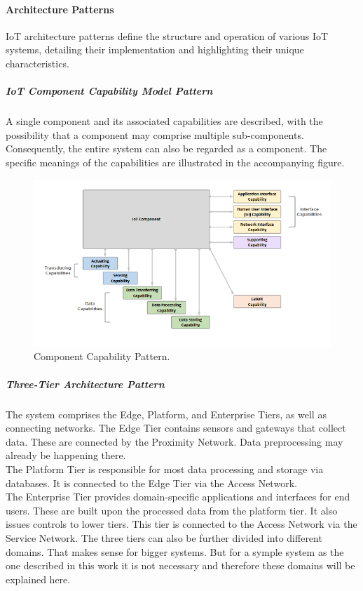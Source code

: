 \paragraph{Architecture Patterns}
IoT architecture patterns define the structure and operation of various IoT systems, detailing their implementation and highlighting their unique characteristics.
\subparagraph{IoT Component Capability Model Pattern}
A single component and its associated capabilities are described, with the possibility that a component may comprise multiple sub-components. Consequently, the entire system can also be regarded as a component. The specific meanings of the capabilities are illustrated in the accompanying figure.
\begin{figure}[H]
	\includegraphics[width=\linewidth]{pic/IIRA-model-component-pattern.png}
	\caption{Component Capability Pattern.}
	\label{fig:Model-Component-Pattern}
\end{figure}
\subparagraph{Three-Tier Architecture Pattern}
The system comprises the Edge, Platform, and Enterprise Tiers, as well as connecting networks. The Edge Tier contains sensors and gateways that collect data. These are connected by the Proximity Network. Data preprocessing may already be happening there.
\\The Platform Tier is responsible for most data processing and storage via databases. It is connected to the Edge Tier via the Access Network.
\\The Enterprise Tier provides domain-specific applications and interfaces for end users. These are built upon the processed data from the platform tier. It also issues controls to lower tiers. This tier is connected to the Access Network via the Service Network.
The three tiers can also be further divided into different domains. That makes sense for bigger systems. But for a symple system as the one described in this work it is not necessary and therefore these domains will be explained here.
